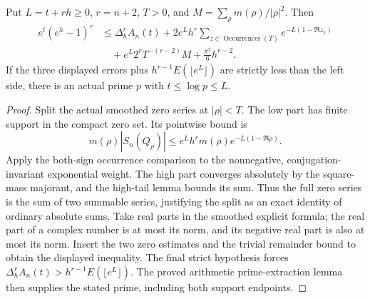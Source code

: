\begin{lemma}
\label{kernel:detector-estimate}
\leanok
Put $L=t+rh\geq0$, $r=n+2$, $T>0$, and
$M=\sum_\rho m(\rho)/|\rho|^2$.
Then
\[
 \begin{aligned}
 e^t(e^h-1)^r&\leq\Delta_h^rA_n(t)
 +2e^Lh^r\sum_{z\in\operatorname{Occurrences}(T)}e^{-L(1-\Re z_1)}\\
 &\quad+e^L2^rT^{-(r-2)}M+\frac{\pi^2}{6}h^{r-2}.
 \end{aligned}
\]
If the three displayed errors plus
$h^{r-1}E(\lfloor e^L\rfloor)$ are strictly less than the left side,
there is an actual prime $p$ with $t\leq\log p\leq L$.
\end{lemma}
\begin{proof}
Split the actual smoothed zero series at $|\rho|<T$.
The low part has finite support in the compact zero set.
Its pointwise bound is
\[
 m(\rho)|S_n(Q_\rho)|
 \leq e^Lh^r m(\rho)e^{-L(1-\Re\rho)}.
\]
Apply the both-sign occurrence comparison to the nonnegative,
conjugation-invariant exponential weight.
The high part converges absolutely by the square-mass majorant, and
the high-tail lemma bounds its sum.
Thus the full zero series is the sum of two summable series, justifying
the split as an exact identity of ordinary absolute sums.
Take real parts in the smoothed explicit formula; the real part of a
complex number is at most its norm, and its negative real part is also
at most its norm.  Insert the two zero estimates and the trivial
remainder bound to obtain the displayed inequality.
The final strict hypothesis forces
$\Delta_h^rA_n(t)>h^{r-1}E(\lfloor e^L\rfloor)$.
The proved arithmetic prime-extraction lemma then supplies the stated
prime, including both support endpoints.
\end{proof}

